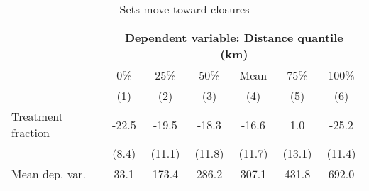 \begin{table}[tb]
\centering
\caption{Sets move toward closures} 
\label{change_distance_closure}
\begin{tabular}{lcccccc}
   \toprule & \multicolumn{6}{c}{Dependent variable: Distance quantile (km)}  \\  \midrule  & 0\% & 25\% & 50\% & Mean & 75\% & 100\% \\ 
   & (1) & (2) & (3) & (4) & (5) & (6) \\ 
   \midrule Treatment fraction & -22.5 & -19.5 & -18.3 & -16.6 & 1.0 & -25.2 \\ 
   & (8.4) & (11.1) & (11.8) & (11.7) & (13.1) & (11.4) \\ 
   \midrule Mean dep. var. & 33.1 & 173.4 & 286.2 & 307.1 & 431.8 & 692.0 \\ 
  \end{tabular}
\end{table}
